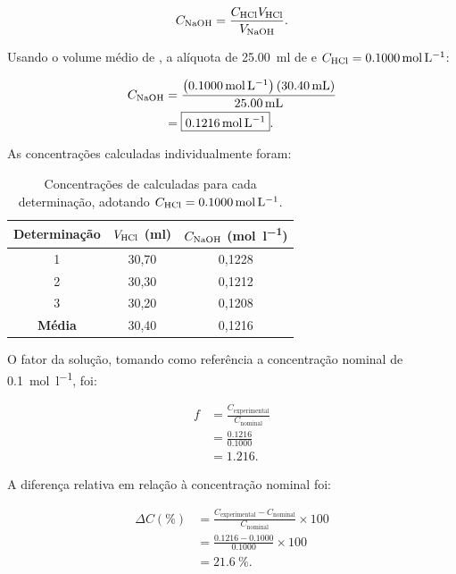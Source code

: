 \documentclass[a4paper,12pt]{article}
\newcommand{\ConcHCl}{0.1000}
\begin{document}
\begin{equation}
  C_{\ce{NaOH}}
  =
  \frac{C_{\ce{HCl}}V_{\ce{HCl}}}
       {V_{\ce{NaOH}}}.
  \label{eq:cnaoh}
\end{equation}

Usando o volume médio de , a alíquota de
\qty{25.00}{\milli\litre} de  e
$C_{\ce{HCl}}=\qty{\ConcHCl}{\mole\per\litre}$:

\begin{align}
  C_{\ce{NaOH}}
    &=
    \frac{
      \left(\qty{\ConcHCl}{\mole\per\litre}\right)
      \left(\qty{30.40}{\milli\litre}\right)}
      {\qty{25.00}{\milli\litre}} \nonumber\\
    &=\boxed{\qty{0.1216}{\mole\per\litre}}.
  \label{eq:resultado_cnaoh}
\end{align}

As concentrações calculadas individualmente foram:

\begin{table}[H]
  \centering
  \caption{Concentrações de  calculadas para cada determinação,
  adotando $C_{\ce{HCl}}=\qty{\ConcHCl}{\mole\per\litre}$.}
  \label{tab:concentracoes}
  \begin{tabular}{
    c
    S[table-format=2.2]
    S[table-format=1.4]
  }
    \toprule
    \textbf{Determinação}
      & {\textbf{$V_{\ce{HCl}}$} (\si{\milli\litre})}
      & {\textbf{$C_{\ce{NaOH}}$} (\si{\mole\per\litre})} \\
     & 30,70 & 0,1228 \\
    2 & 30,30 & 0,1212 \\
    3 & 30,20 & 0,1208 \\
    \midrule
    \textbf{Média} & 30,40 & 0,1216 \\
    \bottomrule
  \end{tabular}
\end{table}

O fator da solução, tomando como referência a concentração nominal de
\qty{0.1}{\mole\per\litre}, foi:

\begin{align}
  f
    &=\frac{C_{\text{experimental}}}{C_{\text{nominal}}} \nonumber\\
    &=\frac{0.1216}{0.1000} \nonumber\\
    &=\boxed{1.216}.
  \label{eq:fator}
\end{align}

A diferença relativa em relação à concentração nominal foi:

\begin{align}
  \Delta C(\%)
    &=\frac{C_{\text{experimental}}-C_{\text{nominal}}}
            {C_{\text{nominal}}}\times100 \nonumber\\
    &=\frac{0.1216-0.1000}{0.1000}\times100 \nonumber\\
    &=\boxed{\qty{21.6}{\percent}}.
  \label{eq:diferenca}
\end{align}
\end{document}
